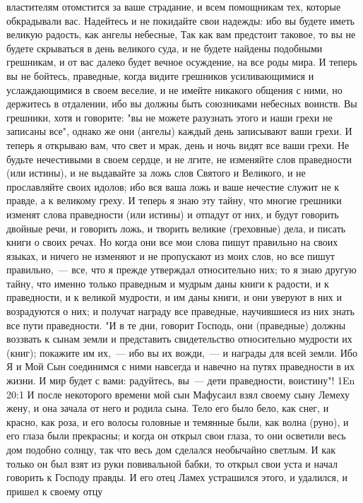 властителям отомстится за ваше страдание, и всем помощникам тех, которые
обкрадывали вас.
Надейтесь и не покидайте свои надежды: ибо вы будете иметь великую
радость, как ангелы небесные, Так как вам предстоит таковое, то вы не будете
скрываться в день великого суда, и не будете найдены подобными грешникам, и от
вас далеко будет вечное осуждение, на все роды мира.
И теперь вы не бойтесь, праведные, когда видите грешников
усиливающимися и услаждающимися в своем веселие, и не имейте никакого общения с
ними, но держитесь в отдалении, ибо вы должны быть союзниками небесных воинств.
Вы грешники, хотя и говорите: "вы не можете разузнать этого и наши
грехи не записаны все", однако же они (ангелы) каждый день записывают ваши
грехи.
И теперь я открываю вам, что свет и мрак, день и ночь видят все ваши
грехи.
Не будьте нечестивыми в своем сердце, и не лгите, не изменяйте слов
праведности (или истины), и не выдавайте за ложь слов Святого и Великого, и не
прославляйте своих идолов; ибо вся ваша ложь и ваше нечестие служит не к
правде, а к великому греху.
И теперь я знаю эту тайну, что многие грешники изменят слова
праведности (или истины) и отпадут от них, и будут говорить двойные речи, и
говорить ложь, и творить великие (греховные) дела, и писать книги о своих
речах.
Но когда они все мои слова пишут правильно на своих языках, и ничего
не изменяют и не пропускают из моих слов, но все пишут правильно,~--- все, что я
прежде утверждал относительно них; то я знаю другую тайну, что именно только
праведным и мудрым даны книги к радости, и к праведности, и к великой мудрости,
и им даны книги, и они уверуют в них и возрадуются о них; и получат награду все
праведные, научившиеся из них знать все пути праведности.
"И в те дни, говорит Господь, они (праведные) должны воззвать к
сынам земли и представить свидетельство относительно мудрости их (книг);
покажите им их,~--- ибо вы их вожди,~--- и награды для всей земли.
Ибо Я и Мой Сын соединимся с ними навсегда и навечно на путях
праведности в их жизни.
И мир будет с вами: радуйтесь, вы~--- дети праведности, воистину"!
\vs 1En 20:1
И после некоторого времени мой сын Мафусаил взял своему сыну
Лемеху жену, и она зачала от него и родила сына.
Тело его было бело, как снег, и красно, как роза, и его волосы головные
и темянные были, как волна (руно), и его глаза были прекрасны; и когда он
открыл свои глаза, то они осветили весь дом подобно солнцу, так что весь дом
сделался необычайно светлым.
И как только он был взят из руки повивальной бабки, то открыл свои уста
и начал говорить к Господу правды.
И его отец Ламех устрашился этого, и удалился, и пришел к своему отцу
